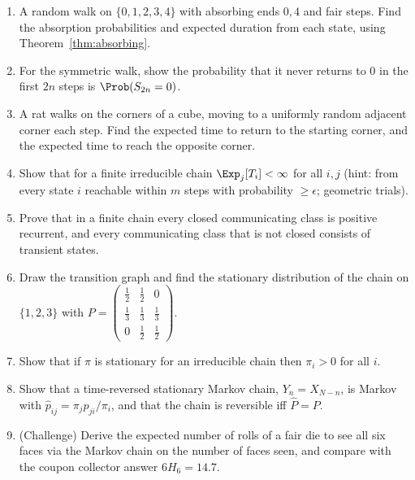 \begin{enumerate}
\item A random walk on $\{0,1,2,3,4\}$ with absorbing ends $0,4$ and
fair steps. Find the absorption probabilities and expected duration from each state,
using Theorem~\ref{thm:absorbing}.
\item For the symmetric walk, show the probability that it never returns to $0$ in
the first $2n$ steps is $\Prob(S_{2n}=0)$.
\item A rat walks on the corners of a cube, moving to a uniformly random adjacent
corner each step. Find the expected time to return to the starting corner, and the expected
time to reach the opposite corner.
\item Show that for a finite irreducible chain $\Exp_j[T_i]<\infty$ for all $i,j$
(hint: from every state $i$ reachable within $m$ steps with probability $\ge\epsilon$;
geometric trials).
\item Prove that in a finite chain every closed communicating class is positive recurrent,
and every communicating class that is not closed consists of transient states.
\item Draw the transition graph and find the stationary distribution of the chain
on $\{1,2,3\}$ with $P=\begin{pmatrix}\frac12&\frac12&0\\ \frac13&\frac13&\frac13\\0&\frac12&\frac12\end{pmatrix}$.
\item Show that if $\pi$ is stationary for an irreducible chain then $\pi_i>0$ for all $i$.
\item Show that a time-reversed stationary Markov chain, $Y_n=X_{N-n}$, is Markov with
$\hat p_{ij}=\pi_jp_{ji}/\pi_i$, and that the chain is reversible iff $\hat P=P$.
\item (Challenge) Derive the expected number of rolls of a fair die to see all six faces via
the Markov chain on the number of faces seen, and compare with the coupon collector answer
$6H_6=14.7$.
\end{enumerate}
